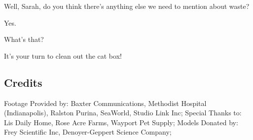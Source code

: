 Well, Sarah, do you think there's anything else we need to mention about waste?

Yes.

What's that?

It's your turn to clean out the cat box!

\subsection{Credits}

Footage Provided by: Baxter Communications, Methodist Hospital (Indianapolis), Ralston Purina, SeaWorld, Studio Link Inc;
Special Thanks to: Lis Daily Home, Rose Acre Farms, Wayport Pet Supply;
Models Donated by: Frey Scientific Inc, Denoyer-Geppert Science Company;